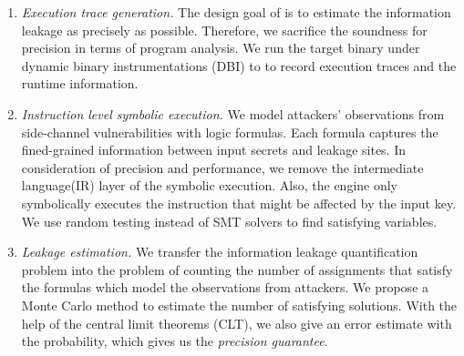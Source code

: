 \begin{enumerate}
    \item \emph{Execution trace generation.} The design goal of \tool{} is to
          estimate the information leakage as precisely as possible. Therefore,
          we sacrifice the soundness for precision in terms of program
          analysis. We run the target binary under dynamic binary instrumentations (DBI) to
          to record execution traces and the runtime information.
    \item \emph{Instruction level symbolic execution.} We model attackers'
          observations from side-channel vulnerabilities with logic formulas.
          Each formula captures the fined-grained information between input
          secrets and leakage sites. In consideration of precision and
          performance, we remove the intermediate language(IR) layer of the
          symbolic execution. Also, the engine only symbolically executes the
          instruction that might be affected by the input key. We use random
          testing instead of SMT solvers to find satisfying variables. 
    \item \emph{Leakage estimation.} We transfer the information leakage quantification
          problem into the problem of counting the number of assignments that satisfy the
          formulas which model the observations from attackers. We propose a
          Monte Carlo method to estimate the number of satisfying solutions.
          With the help of the central
          limit theorems (CLT), we also give an error estimate with the probability,
          which gives us the \emph{precision guarantee}.

\end{enumerate}



